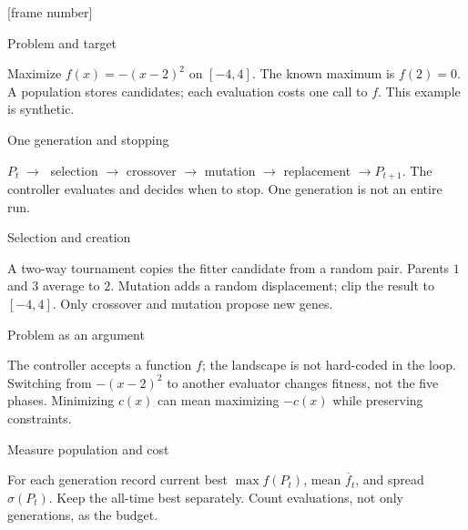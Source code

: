 


[frame number]

\date{}




\begin{frame}{Problem and target}

Maximize $f(x)=-(x-2)^2$ on $[-4,4]$. The known maximum is $f(2)=0$. A population stores candidates; each evaluation costs one call to $f$. This example is synthetic.

\end{frame}

\begin{frame}{One generation and stopping}

$P_t\;\longrightarrow\;$ selection $\longrightarrow$ crossover $\longrightarrow$ mutation $\longrightarrow$ replacement $\longrightarrow P_{t+1}$. The controller evaluates and decides when to stop. One generation is not an entire run.

\end{frame}

\begin{frame}{Selection and creation}

A two-way tournament copies the fitter candidate from a random pair. Parents $1$ and $3$ average to $2$. Mutation adds a random displacement; clip the result to $[-4,4]$. Only crossover and mutation propose new genes.

\end{frame}

\begin{frame}{Problem as an argument}

The controller accepts a function $f$; the landscape is not hard-coded in the loop. Switching from $-(x-2)^2$ to another evaluator changes fitness, not the five phases. Minimizing $c(x)$ can mean maximizing $-c(x)$ while preserving constraints.

\end{frame}

\begin{frame}{Measure population and cost}

For each generation record current best $\max f(P_t)$, mean $\overline f_t$, and spread $\sigma(P_t)$. Keep the all-time best separately. Count evaluations, not only generations, as the budget.

\end{frame}

